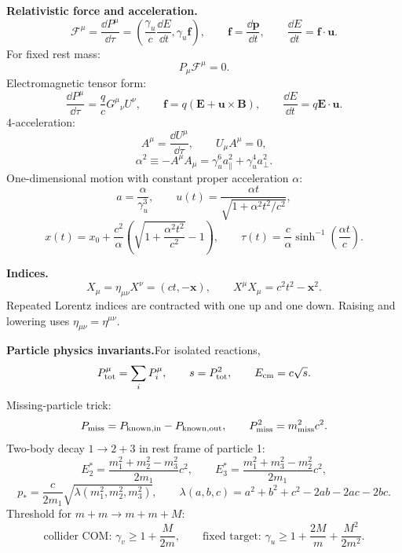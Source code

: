 \noindent\textbf{Relativistic force and acceleration.}\quad
\[
  \mathcal F^\mu=\frac{\dd P^\mu}{\dd\tau}
  =\left(\frac{\gamma_u}{c}\frac{\dd E}{\dd t},\gamma_u\mathbf f\right),
  \qquad
  \mathbf f=\frac{\dd\mathbf p}{\dd t},\qquad
  \frac{\dd E}{\dd t}=\mathbf f\cdot\mathbf u.
\]
For fixed rest mass:
\[
  P_\mu\mathcal F^\mu=0.
\]
Electromagnetic tensor form:
\[
  \frac{\dd P^\mu}{\dd\tau}=\frac{q}{c}G^\mu{}_\nu U^\nu,\qquad
  \mathbf f=q(\mathbf E+\mathbf u\times\mathbf B),\qquad
  \frac{\dd E}{\dd t}=q\mathbf E\cdot\mathbf u.
\]
4-acceleration:
\[
  A^\mu=\frac{\dd U^\mu}{\dd\tau},\qquad U_\mu A^\mu=0,
\]
\[
  \alpha^2\equiv -A^\mu A_\mu=\gamma_u^6a_\parallel^2+\gamma_u^4a_\perp^2.
\]
One-dimensional motion with constant proper acceleration $\alpha$:
\[
  a=\frac{\alpha}{\gamma_u^3},\qquad
  u(t)=\frac{\alpha t}{\sqrt{1+\alpha^2t^2/c^2}},
\]
\[
  x(t)=x_0+\frac{c^2}{\alpha}\left(\sqrt{1+\frac{\alpha^2t^2}{c^2}}-1\right),
  \qquad
  \tau(t)=\frac{c}{\alpha}\sinh^{-1}\left(\frac{\alpha t}{c}\right).
\]

\noindent\textbf{Indices.}\quad
\[
  X_\mu=\eta_{\mu\nu}X^\nu=(ct,-\mathbf x),\qquad
  X^\mu X_\mu=c^2t^2-\mathbf x^2.
\]
Repeated Lorentz indices are contracted with one up and one down. Raising and
lowering uses $\eta_{\mu\nu}=\eta^{\mu\nu}$. 

\noindent\textbf{Particle physics invariants.}\quad For isolated reactions,
\[
  P_{\rm tot}^\mu=\sum_iP_i^\mu,\qquad
  s=P_{\rm tot}^2,\qquad
  E_{\rm cm}=c\sqrt{s}.
\]
Missing-particle trick:
\[
  P_{\rm miss}=P_{\rm known,in}-P_{\rm known,out},\qquad
  P_{\rm miss}^2=m_{\rm miss}^2c^2.
\]
Two-body decay $1\to2+3$ in rest frame of particle 1:
\[
  E_2^\ast=\frac{m_1^2+m_2^2-m_3^2}{2m_1}c^2,\qquad
  E_3^\ast=\frac{m_1^2+m_3^2-m_2^2}{2m_1}c^2,
\]
\[
  p_\ast=\frac{c}{2m_1}\sqrt{\lambda(m_1^2,m_2^2,m_3^2)},\qquad
  \lambda(a,b,c)=a^2+b^2+c^2-2ab-2ac-2bc.
\]
Threshold for $m+m\to m+m+M$:
\[
  \text{collider COM: }\gamma_v\ge1+\frac{M}{2m},\qquad
  \text{fixed target: }\gamma_u\ge1+\frac{2M}{m}+\frac{M^2}{2m^2}.
\]

